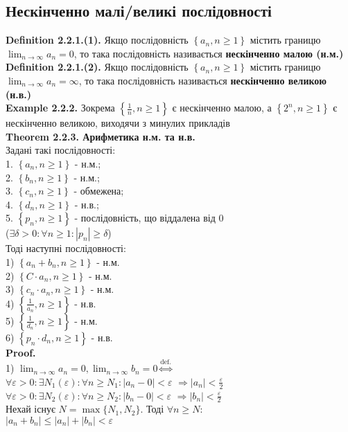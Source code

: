 \documentclass[a4paper, 14pt]{extarticle}
\def\bigline{\vspace{5mm}\\}
\def\bigline{\vspace{5mm}\\}
\def\sequence#1{$\displaystyle \left\{ {#1}, n\geq1 \right\}$}
\def\limitdef#1#2#3#4#5{$\displaystyle \forall #1 > 0: \exists #2(#1): \forall #3 \geq #2: \left|#4 - #5\right| < #1$}
\begin{document}
	\subsection{Нескінченно малі/великі послідовності}
	\textbf{Definition 2.2.1.(1).} Якщо послідовність \sequence{a_n} містить границю $\displaystyle\lim_{n \to \infty} a_n = 0$, то така послідовність називається \textbf{нескінченно малою (н.м.)}\\
	\textbf{Definition 2.2.1.(2).} Якщо послідовність \sequence{a_n} містить границю $\displaystyle\lim_{n \to \infty} a_n = \infty$, то така послідовність називається \textbf{нескінченно великою (н.в.)}
	\bigline
	\textbf{Example 2.2.2.} Зокрема \sequence{\frac{1}{n}} є нескінченно малою, а \sequence{2^n} є нескінченно великою, виходячи з минулих прикладів
	\bigline
	\textbf{Theorem 2.2.3. Арифметика н.м. та н.в.}\\
	Задані такі послідовності:\\
	1. \sequence{a_n} - н.м.;\\
	2. \sequence{b_n} - н.м.;\\
	3. \sequence{c_n} - обмежена;\\
	4. \sequence{d_n} - н.в.;\\
	5. \sequence{p_n} - послідовність, що віддалена від 0 \\ ($\exists \delta>0: \forall n\geq 1: |p_n|\geq \delta$)\\
	Тоді наступні послідовності:\\
	1) \sequence{a_n+b_n} - н.м.\\
	2) \sequence{C \cdot a_n} - н.м.\\
	3) \sequence{c_n \cdot a_n} - н.м.\\
	4) \sequence{\frac{1}{a_n}} - н.в.\\
	5) \sequence{\frac{1}{d_n}} - н.м.\\
	6) \sequence{p_n \cdot d_n} - н.в.\\
	\textbf{Proof.}\\
	1) $\displaystyle \lim_{n \to \infty} a_n = 0, \lim_{n \to \infty} b_n = 0 \overset{\textrm{def.}}{\iff}$\\
	\limitdef{\varepsilon}{N_1}{n}{a_n}{0} $\displaystyle \Rightarrow |a_n|<\frac{\varepsilon}{2}$\\
	\limitdef{\varepsilon}{N_2}{n}{b_n}{0} $\displaystyle \Rightarrow |b_n|<\frac{\varepsilon}{2}$\\
	Нехай існує $N=\max\{N_1,N_2\}$. Тоді $\forall n \geq N:$\\
	$|a_n+b_n| \leq |a_n|+|b_n| < \varepsilon$\\
\end{document}
